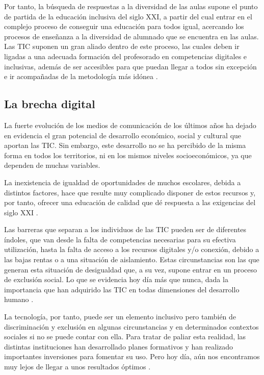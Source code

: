 \documentclass[spanish]{textolivre}
\begin{document}
Por tanto, la búsqueda de respuestas a la diversidad de las aulas supone el punto de partida de la educación inclusiva del siglo XXI, a partir del cual entrar en el complejo proceso de conseguir una educación para todos igual, acercando los procesos de enseñanza a la diversidad de alumnado que se encuentra en las aulas. Las TIC suponen un gran aliado dentro de este proceso, las cuales deben ir ligadas a una adecuada formación del profesorado en competencias digitales e inclusivas, además de ser accesibles para que puedan llegar a todos sin excepción e ir acompañadas de la metodología más idónea \cite{marindiaz2020}.

\subsection{La brecha digital}
La fuerte evolución de los medios de comunicación de los últimos años ha dejado en evidencia el gran potencial de desarrollo económico, social y cultural que aportan las TIC. Sin embargo, este desarrollo no se ha percibido de la misma forma en todos los territorios, ni en los mismos niveles socioeconómicos, ya que dependen de muchas variables.

La inexistencia de igualdad de oportunidades de muchos escolares, debida a distintos factores, hace que resulte muy complicado disponer de estos recursos y, por tanto, ofrecer una educación de calidad que dé respuesta a las exigencias del siglo XXI \cite{moralesromo2017}.

Las barreras que separan a los individuos de las TIC pueden ser de diferentes índoles, que van desde la falta de competencias necesarias para su efectiva utilización, hasta la falta de acceso a los recursos digitales y/o conexión, debido a las bajas rentas o a una situación de aislamiento. Estas circunstancias son las que generan esta situación de desigualdad que, a su vez, supone entrar en un proceso de exclusión social. Lo que se evidencia hoy día más que nunca, dada la importancia que han adquirido las TIC en todas dimensiones del desarrollo humano \cite{martinezlopez2020}.

La tecnología, por tanto, puede ser un elemento inclusivo pero también de discriminación y exclusión en algunas circunstancias y en determinados contextos sociales si no se puede contar con ella. Para tratar de paliar esta realidad, las distintas instituciones han desarrollado planes formativos y han realizado importantes inversiones para fomentar su uso. Pero hoy día, aún nos encontramos muy lejos de llegar a unos resultados óptimos \cite{caberoalmenara2017}.
\end{document}
